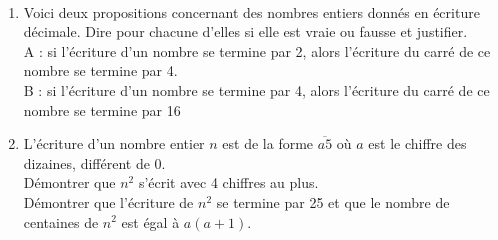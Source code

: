 \begin{exercice} %
\ \\ [-10mm]
   \begin{enumerate}
      \item Voici deux propositions concernant des nombres entiers donnés en écriture décimale. Dire pour chacune d'elles si elle est vraie ou fausse et justifier. \\
          A : si l'écriture d'un nombre se termine par 2, alors l'écriture du carré de ce nombre se termine par 4. \\
         B : si l'écriture d'un nombre se termine par 4, alors l'écriture du carré de ce nombre se termine par 16
      \item L'écriture d'un nombre entier $n$ est de la forme $\overline{a5}$ où $a$ est le chiffre des dizaines, différent de 0. \\
         Démontrer que $n^2$ s'écrit avec 4 chiffres au plus. \\
         Démontrer que l'écriture de $n^2$ se termine par 25 et que le nombre de centaines de $n^2$ est égal à $a(a+1)$.
   \end{enumerate}
\end{exercice}

